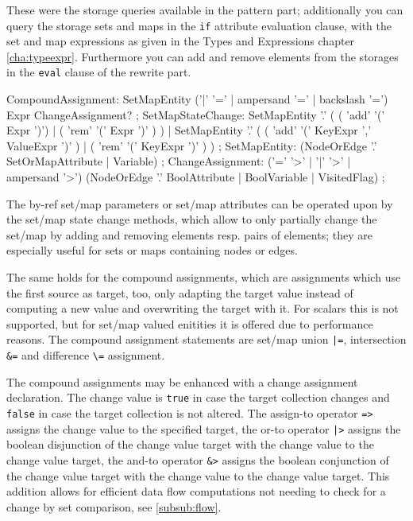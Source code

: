 These were the storage queries available in the pattern part; 
additionally you can query the storage sets and maps in the \texttt{if} attribute evaluation clause,
with the set and map expressions as given in the Types and Expressions chapter \ref{cha:typeexpr}.
Furthermore you can add and remove elements from the storages in the \texttt{eval} clause of the rewrite part.

\begin{rail}    
  CompoundAssignment:
    SetMapEntity ('|' '=' | ampersand '=' | backslash '=') Expr ChangeAssignment?
  ;
  SetMapStateChange:
   	SetMapEntity '.' ( ( 'add' '(' Expr ')') | ( 'rem' '(' Expr ')' ) ) |
	  SetMapEntity '.' ( ( 'add' '(' KeyExpr ',' ValueExpr ')' ) | ( 'rem' '(' KeyExpr ')' ) )
	;
	SetMapEntity:
	  (NodeOrEdge '.' SetOrMapAttribute | Variable)
	;
  ChangeAssignment:
    ('=' '>' | '|' '>' | ampersand '>') (NodeOrEdge '.' BoolAttribute | BoolVariable | VisitedFlag)
  ;
\end{rail}

The by-ref set/map parameters or set/map attributes can be operated upon by the set/map state change methods,
which allow to only partially change the set/map by adding and removing elements resp. pairs of elements;
they are especially useful for sets or maps containing nodes or edges.

The same holds for the compound assignments, which are assignments which use the first source as target, too,
only adapting the target value instead of computing a new value and overwriting the target with it.
For scalars this is not supported, but for set/map valued enitities it is offered due to performance reasons.
The compound assignment statements are set/map union \verb#|=#, intersection \verb#&=# and difference \verb#\=# assignment.

The compound assignments may be enhanced with a change assignment declaration.
The change value is \texttt{true} in case the target collection changes and \texttt{false} in case the target collection is not altered.
The assign-to operator \verb#=># assigns the change value to the specified target, the or-to operator \verb#|># assigns the boolean disjunction of the change value target with the change value to the change value target, the and-to operator \verb#&># assigns the boolean conjunction of the change value target with the change value to the change value target.
This addition allows for efficient data flow computations not needing to check for a change by set comparison, see \ref{subsub:flow}.


